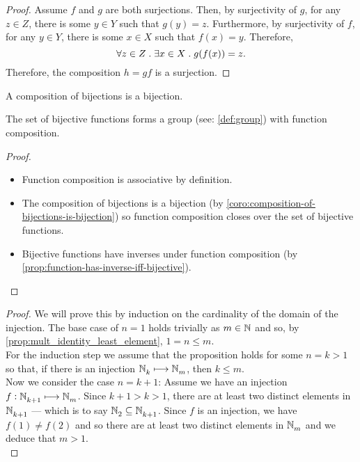 \documentclass[../MathsNotesBase.tex]{subfiles}
\begin{document}
{\begin{proof}
			Assume $f$ and $g$ are both surjections. Then, by surjectivity of $g$, for any ${ z \in Z }$, there is some ${ y \in Y }$ such that ${ g(y) = z }$.
			Furthermore, by surjectivity of $f$, for any ${ y \in Y }$, there is some ${ x \in X }$ such that ${ f(x) = y }$. Therefore,
			\[ \forall z \in Z \;.\; \exists x \in X \;.\; g(f(x)) = z. \]
			Therefore, the composition $h = gf$ is a surjection.
		\end{proof}
		\begin{corollary}\label{coro:composition-of-bijections-is-bijection}
			A composition of bijections is a bijection.
		\end{corollary}
		\begin{corollary}
			The set of bijective functions forms a group (see: \ref{def:group}) with function composition.
		\end{corollary}
		\begin{proof}
			\begin{itemize}
				\item Function composition is associative by definition.
				\item The composition of bijections is a bijection (by \autoref{coro:composition-of-bijections-is-bijection}) so function composition closes over the set of bijective functions.
				\item Bijective functions have inverses under function composition (by \autoref{prop:function-has-inverse-iff-bijective}).
			\end{itemize}
		\end{proof}
	
	
		
		\nl[4]
		\begin{proof}
			We will prove this by induction on the cardinality of the domain of the injection. The base case of ${ n = 1 }$ holds trivially as ${ m \in \mathbb{N}^{} }$ and so, by \autoref{prop:mult_identity_least_element}, ${ 1 = n \leq m }$.\\
			
			For the induction step we assume that the proposition holds for some ${ n = k > 1 }$ so that, if there is an injection ${ \mathbb{N}^{}_k \longmapsto \mathbb{N}^{}_m }$, then ${ k \leq m }$.\\
			
			Now we consider the case ${ n = k+1 }$: Assume we have an injection ${ f: \mathbb{N}^{}_{k+1} \longmapsto \mathbb{N}^{}_m }$. Since ${ k+1 > k > 1 }$, there are at least two distinct elements in $\mathbb{N}^{}_{k+1}$ --- which is to say ${ \mathbb{N}^{}_2 \subseteq \mathbb{N}^{}_{k+1} }$. Since $f$ is an injection, we have ${ f(1) \neq f(2) }$ and so there are at least two distinct elements in $\mathbb{N}^{}_m$ and we deduce that ${ m > 1 }$.\\
			

\end{proof}}
\end{document}
